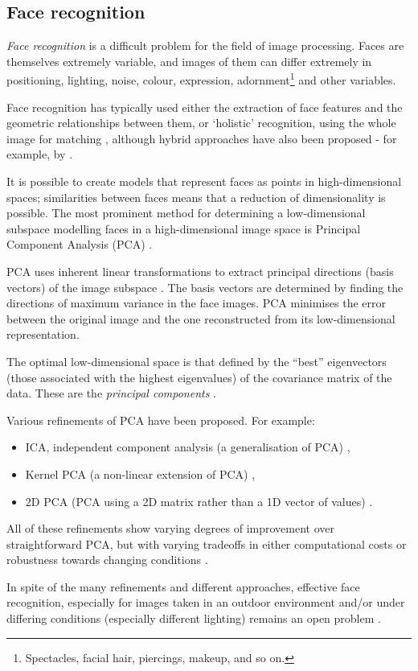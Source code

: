 \subsection{Face recognition}
\label{sec:face-rec-prior}

\emph{Face recognition} is a difficult problem for the field of image
processing. Faces are themselves extremely variable, and images of them can
differ extremely in positioning, lighting, noise, colour, expression,
adornment\footnote{Spectacles, facial hair, piercings, makeup, and so on.} and other
variables.

Face recognition has typically used either the extraction of face features and
the geometric relationships between them, or `holistic' recognition, using the
whole image for matching \cite{eigenfaces}, although hybrid approaches have also
been proposed - for example, by \citet{zhao03:_face}.

It is possible to create models that represent faces as points in
high-dimensional spaces; similarities between faces means that a reduction of
dimensionality is possible. The most prominent method for determining a
low-dimensional subspace modelling faces in a high-dimensional image space is
Principal Component Analysis (PCA) \cite{eigenfaces}.

PCA uses inherent linear transformations to extract principal directions (basis
vectors) of the image subspace \cite{pca}. The basis vectors are determined by
finding the directions of maximum variance in the face images. PCA minimises the
error between the original image and the one reconstructed from its
low-dimensional representation.

The optimal low-dimensional space is that defined by the ``best'' eigenvectors
(those associated with the highest eigenvalues) of the covariance matrix of the
data. These are the \emph{principal components} \cite{pca}.

Various refinements of PCA have been proposed. For example:
\begin{itemize}
\item ICA, independent component
analysis (a generalisation of PCA) \cite{bartlett02:_face},
\item Kernel PCA (a non-linear extension of PCA) \cite{kim02:_face},
\item 2D PCA (PCA using a 2D matrix rather than a 1D vector of values) \cite{yang04:_two_pca}.
\end{itemize}
All of these refinements show varying degrees of improvement over straightforward PCA, but with
varying tradeoffs in either computational costs or robustness towards changing
conditions \cite{yang04:_two_pca}.

In spite of the many refinements and different approaches, effective face
recognition, especially for images taken in an outdoor environment and/or under
differing conditions (especially different lighting) remains an open problem
\cite{zhao03:_face}.
